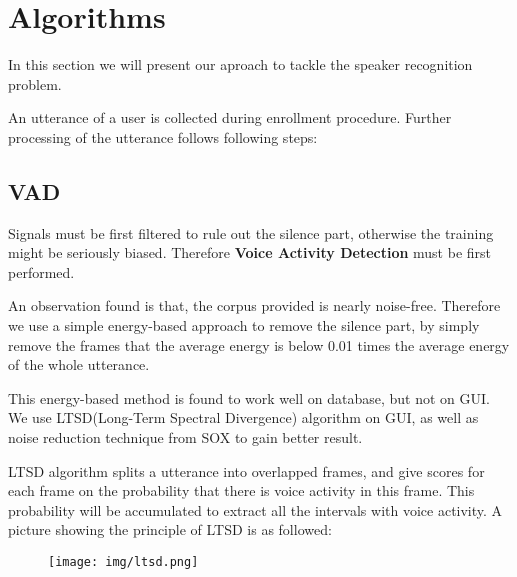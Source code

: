 \section{Algorithms}
	In this section we will present our aproach to tackle the speaker recognition problem.

    An utterance of a user is collected during enrollment procedure.
    Further processing of the utterance follows following steps:
    \subsection{VAD}
        Signals must be first filtered to rule out the silence part, otherwise the
        training might be seriously biased. Therefore \textbf{Voice Activity Detection} must
        be first performed.

        An observation found is that, the corpus provided is nearly noise-free.
        Therefore we use a simple energy-based approach
        to remove the silence part, by simply remove the frames that the average
        energy is below 0.01 times the average energy of the whole utterance.

        This energy-based method is found to work well on database, but not
        on GUI.
        We use LTSD(Long-Term Spectral Divergence) \cite{ltsd1}\cite{ltsd2}
        algorithm on GUI, as well as noise reduction technique from SOX\cite{sox} to gain better result.

        LTSD algorithm splits a utterance into overlapped frames, and give scores for each frame on
        the probability that there is voice activity in this frame. This probability will be accumulated
        to extract all the intervals with voice activity. A picture showing the principle of LTSD is as followed:

        \begin{figure}[H]
          \centering
          \texttt{[image: img/ltsd.png]}
        \end{figure}

        
        
